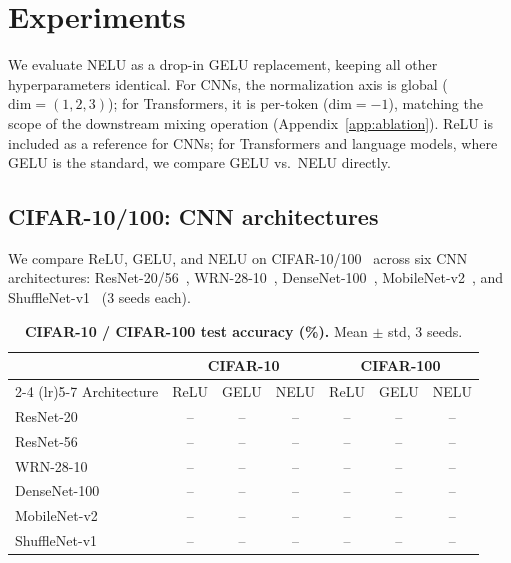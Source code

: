 \section{Experiments}\label{sec:experiments}

We evaluate NELU as a drop-in GELU replacement, keeping all other hyperparameters identical.
For CNNs, the normalization axis is global ($\mathrm{dim}{=}(1{,}2{,}3)$); for Transformers, it is per-token ($\mathrm{dim}{=}{-}1$), matching the scope of the downstream mixing operation (Appendix~\ref{app:ablation}).
ReLU is included as a reference for CNNs; for Transformers and language models, where GELU is the standard, we compare GELU vs.\ NELU directly.

\subsection{CIFAR-10/100: CNN architectures}\label{sec:cifar}

We compare ReLU, GELU, and NELU on CIFAR-10/100~\citep{krizhevsky2009learning} across six CNN architectures: ResNet-20/56~\citep{he2016deep}, WRN-28-10~\citep{zagoruyko2016wide}, DenseNet-100~\citep{huang2017densely}, MobileNet-v2~\citep{sandler2018mobilenetv2}, and ShuffleNet-v1~\citep{zhang2018shufflenet} (3 seeds each).

\begin{table}[t]
\centering
\caption{\textbf{CIFAR-10 / CIFAR-100 test accuracy (\%).} Mean $\pm$ std, 3 seeds.}
\label{tab:cifar}
\vspace{0.5em}
\small
\begin{tabular}{lcccccc}
\toprule
 & \multicolumn{3}{c}{CIFAR-10} & \multicolumn{3}{c}{CIFAR-100} \\
\cmidrule(lr){2-4} \cmidrule(lr){5-7}
Architecture & ReLU & GELU & NELU & ReLU & GELU & NELU \\
\midrule
ResNet-20    & -- & -- & -- & -- & -- & -- \\
ResNet-56    & -- & -- & -- & -- & -- & -- \\
WRN-28-10    & -- & -- & -- & -- & -- & -- \\
DenseNet-100 & -- & -- & -- & -- & -- & -- \\
MobileNet-v2 & -- & -- & -- & -- & -- & -- \\
ShuffleNet-v1 & -- & -- & -- & -- & -- & -- \\
\bottomrule
\end{tabular}
\end{table}

